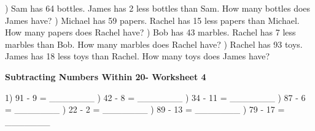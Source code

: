 \documentclass{article}%
\begin{document}
\newline%
\newline%
) Sam has 64 bottles. James has 2 less bottles than Sam. How many bottles does James have?%
\newline%
\newline%
) Michael has 59 papers. Rachel has 15 less papers than Michael. How many papers does Rachel have?%
\newline%
\newline%
) Bob has 43 marbles. Rachel has 7 less marbles than Bob. How many marbles does Rachel have?%
\newline%
\newline%
) Rachel has 93 toys. James has 18 less toys than Rachel. How many toys does James have?%
\newline%
\newline%
\newline%
\pagebreak%
\large%
\begin{center}%
\textbf{Subtracting Numbers Within 20- Worksheet 4}%
\newline%
\newline%
\newline%
\end{center} \normalsize%
1) 91 {-} 9 = \_\_\_\_\_\_\_%
\newline%
\newline%
) 42 {-} 8 = \_\_\_\_\_\_\_%
\newline%
\newline%
) 34 {-} 11 = \_\_\_\_\_\_\_%
\newline%
\newline%
) 87 {-} 6 = \_\_\_\_\_\_\_%
\newline%
\newline%
) 22 {-} 2 = \_\_\_\_\_\_\_%
\newline%
\newline%
) 89 {-} 13 = \_\_\_\_\_\_\_%
\newline%
\newline%
) 79 {-} 17 = \_\_\_\_\_\_\_%
\newline%
\end{document}
